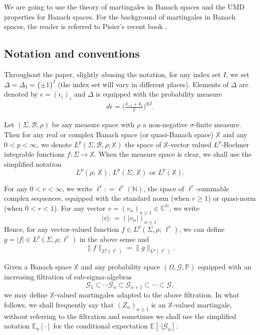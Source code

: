 \documentclass[12pt]{amsart}
\theoremstyle{definition}
\theoremstyle{remark}
\newcommand{\N}{\mathbb{N}}
\newcommand{\C}{\mathbb{C}}
\newcommand{\E}{\mathbb{E}}
\newcommand{\PP}{\mathbb{P}}
\newcommand{\fX}{\mathbb{X}}
\numberwithin{equation}{section}
\begin{document}
We are going to use the theory of martingales in Banach spaces and the UMD properties for Banach spaces.   For the background of martingales in Banach spaces, the reader is referred to Pisier's recent book \cite[Chapter 5 and Chapter 10]{Pisier-book}. 

\subsection{Notation and conventions}\label{sec-not}
Throughout the paper,  slightly abusing the notation, for any index set $I$,  we set $\Delta  = \Delta_I= \{\pm 1\}^I$ (the index set will vary in different places).  Elements of $\Delta$ are denoted by $\epsilon= (\epsilon_i)_i$ and $\Delta$ is  equipped with the probability measure  
\begin{align}\label{def-dep}
d \epsilon = \Big(\frac{\delta_{-1} + \delta_1}{2}\Big)^{\otimes I}.
\end{align}


Let $(\Sigma,  \mathcal{B},  \rho)$  be  any measure space with $\rho$ a non-negative $\sigma$-finite measure.  Then for any real or complex Banach space (or quasi-Banach space) $\fX$ and any $0<p<\infty$, we denote $L^p(\Sigma, \mathcal{B}, \rho; \fX)$ the space of $\fX$-vector valued $L^p$-Bochner integrable functions $f: \Sigma\rightarrow \fX$.  When the measure space is clear, we shall use  the simplified notation
\[
 L^p(\rho; \,\fX), \,  L^p(\Sigma; \,\fX) \,\, \text{or}\,\,  L^p(\fX). 
\]



For any $0<r< \infty$, we write 
$
\ell^r : = \ell^r(\N)$, 
the space of $\ell^r$-summable complex sequences, equipped with the standard norm (when $r\ge 1$) or quasi-norm (when $0<r<1$).  For any vector $v = (v_n)_{n\ge 1}\in \C^\N$, we write 
\[
|v| : = (|v_n|)_{n\ge 1}. 
\]
Hence, for any vector-valued function  $f\in L^p(\Sigma, \rho; \, \ell^r)$, we can define  $g= |f|\in L^p(\Sigma, \rho; \ell^r)$ in the above sense and 
\[
\| f\|_{L^p(\ell^r)}  = \| g \|_{L^p(\ell^r)}. 
\] 







Given a Banach space $\fX$ and  any probability space $(\Omega,  \mathscr{G}, \PP)$ equipped with an increasing filtration  of sub-sigma-algebras
 \[
 \mathscr{G}_1\subset \cdots  \mathscr{G}_n \subset  \mathscr{G}_{n+1} \subset \cdots \subset  \mathscr{G},
 \] 
 we may define $\fX$-valued martingales adapted to the above filtration. In what follows, we shall frequently say that  $(Z_n)_{n\ge 1}$ is an $\fX$-valued martingale, without referring to the filtration and sometimes we shall use the simplified notation $\E_n[\cdot]$ for the conditional expectation $\E[\cdot|\mathscr{G}_n]$. 
\end{document}
